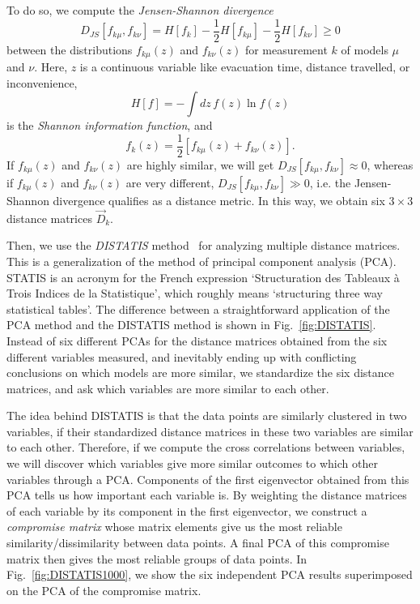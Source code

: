 To do so, we compute the \emph{Jensen-Shannon divergence}~\cite{Lin:1991it}
\begin{equation}
D_{JS}[f_{k\mu}, f_{k\nu}] = H[f_k] - \frac{1}{2} H[f_{k\mu}] - \frac{1}{2} H[f_{k\nu}] \geq 0
\end{equation}
between the distributions $f_{k\mu}(z)$ and $f_{k\nu}(z)$ for measurement $k$ of models $\mu$ and $\nu$. Here, $z$ is a continuous variable like evacuation time, distance travelled, or inconvenience,
\begin{equation}
H[f] = -\int dz\, f(z) \ln f(z)
\end{equation}
is the \emph{Shannon information function}, and
\begin{equation}
f_k(z) = \frac{1}{2}\left[f_{k\mu}(z) + f_{k\nu}(z)\right].
\end{equation}
If $f_{k\mu}(z)$ and $f_{k\nu}(z)$ are highly similar, we will get $D_{JS}[f_{k\mu}, f_{k\nu}] \approx 0$, whereas if $f_{k\mu}(z)$ and $f_{k\nu}(z)$ are very different, $D_{JS}[f_{k\mu}, f_{k\nu}] \gg 0$, i.e. the Jensen-Shannon divergence qualifies as a distance metric. In this way, we obtain six $3 \times 3$ distance matrices $\vec{D}_k$.

Then, we use the \emph{DISTATIS} method~\cite{Abdi:DISTATIS} for analyzing multiple distance matrices. This is a generalization of the method of principal component analysis (PCA). STATIS is an acronym for the French expression `Structuration des Tableaux \`{a} Trois Indices de la Statistique', which roughly means `structuring three way statistical tables'. The difference between a straightforward application of the PCA method and the DISTATIS method is shown in Fig.~\ref{fig:DISTATIS}. Instead of six different PCAs for the distance matrices obtained from the six different variables measured, and inevitably ending up with conflicting conclusions on which models are more similar, we standardize the six distance matrices, and ask which variables are more similar to each other.

The idea behind DISTATIS is that the data points are similarly clustered in two variables, if their standardized distance matrices in these two variables are similar to each other. Therefore, if we compute the cross correlations between variables, we will discover which variables give more similar outcomes to which other variables through a PCA. Components of the first eigenvector obtained from this PCA tells us how important each variable is. By weighting the distance matrices of each variable by its component in the first eigenvector, we construct a \emph{compromise matrix} whose matrix elements give us the most reliable similarity/dissimilarity between data points. A final PCA of this compromise matrix then gives the most reliable groups of data points. In Fig.~\ref{fig:DISTATIS1000}, we show the six independent PCA results superimposed on the PCA of the compromise matrix.

